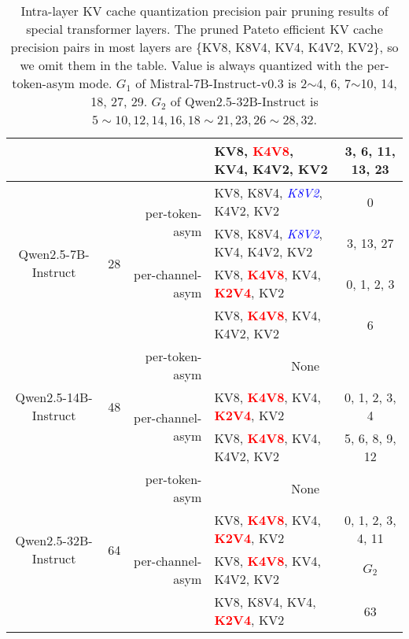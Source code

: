 \begin{table}
{\begin{tabular}{c c r l c}
 & & & KV8, \textcolor{red}{\textbf{K4V8}}, KV4, K4V2, KV2  & 3, 6, 11, 13, 23 \\ \hline
\multirow{4}{*}{Qwen2.5-7B-Instruct}  & \multirow{4}{*}{28} & \multirow{2}{*}{per-token-asym} & KV8, K8V4, \textcolor{blue}{\textit{K8V2}}, K4V2, KV2 & 0 \\ 
 & & & KV8, K8V4, \textcolor{blue}{\textit{K8V2}}, KV4, K4V2, KV2 & 3, 13, 27 \\ \cline{3-5}
 & & per-channel-asym & KV8, \textcolor{red}{\textbf{K4V8}}, KV4, \textcolor{red}{\textbf{K2V4}}, KV2 & 0, 1, 2, 3 \\
 & & &  KV8, \textcolor{red}{\textbf{K4V8}}, KV4, K4V2, KV2 & 6 \\ \hline
 \multirow{3}{*}{Qwen2.5-14B-Instruct} & \multirow{3}{*}{48} & per-token-asym & \multicolumn{2}{c}{None} \\ \cline{3-5}
 & & \multirow{2}{*}{per-channel-asym} & KV8, \textcolor{red}{\textbf{K4V8}}, KV4, \textcolor{red}{\textbf{K2V4}}, KV2 & 0, 1, 2, 3, 4  \\ 
  & & & KV8, \textcolor{red}{\textbf{K4V8}}, KV4, K4V2, KV2 & 5, 6, 8, 9, 12 \\ \hline
  \multirow{4}{*}{Qwen2.5-32B-Instruct} & \multirow{4}{*}{64} & per-token-asym &  \multicolumn{2}{c}{None}  \\ \cline{3-5}
 & & \multirow{3}{*}{per-channel-asym} &  KV8, \textcolor{red}{\textbf{K4V8}}, KV4, \textcolor{red}{\textbf{K2V4}}, KV2 & 0, 1, 2, 3, 4, 11  \\
  & & & KV8, \textcolor{red}{\textbf{K4V8}}, KV4, K4V2, KV2 & $G_2$ \\
  & & & KV8, K8V4, KV4, \textcolor{red}{\textbf{K2V4}}, KV2 & 63\\
\bottomrule
\end{tabular}
}
\caption{Intra-layer KV cache quantization precision pair pruning results of special transformer layers. The pruned Pateto efficient KV cache precision pairs in most layers are \{KV8, K8V4, KV4, K4V2, KV2\}, so we omit them in the table. Value is always quantized with the per-token-asym mode.  $G_1$ of Mistral-7B-Instruct-v0.3 is 2$\sim$4, 6, 7$\sim$10, 14, 18, 27, 29. $G_2$ of Qwen2.5-32B-Instruct is $5\sim10, 12, 14, 16, 18\sim21, 23, 26\sim28, 32$.}
\label{tab:intra_layer_kvcache_quantization_precision_pairs}
\end{table}

